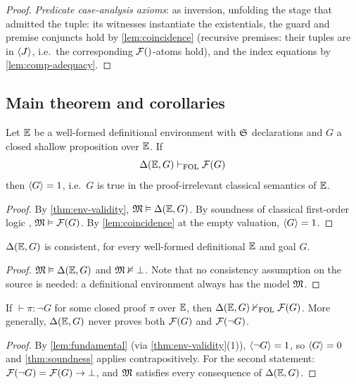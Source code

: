 \begin{proof}
\emph{Predicate case-analysis axioms}: as inversion, unfolding the stage
that admitted the tuple: its witnesses instantiate the existentials, the
guard and premise conjuncts hold by \cref{lem:coincidence} (recursive
premises: their tuples are in $\langle J \rangle$, i.e.\ the corresponding
$\mathcal{F}()$-atoms hold), and the index equations by
\cref{lem:comp-adequacy}.
\end{proof}

\subsection{Main theorem and corollaries}

\begin{theorem}[Soundness]
\label{thm:soundness}
Let $\mathbb{E}$ be a well-formed definitional environment with $\mathfrak{S}$
declarations and $G$ a closed shallow proposition over $\mathbb{E}$.  If
\[
  \Delta(\mathbb{E},G) \vdash_{\mathrm{FOL}} \mathcal{F}(G)
\]
then $\langle G \rangle = 1$, i.e.\ $G$ is true in the proof-irrelevant classical
semantics of $\mathbb{E}$.
\end{theorem}

\begin{proof}
By \cref{thm:env-validity}, $\mathfrak{M} \vDash \Delta(\mathbb{E},G)$.  By soundness of
classical first-order logic \cite{Shoenfield1967}, $\mathfrak{M} \vDash \mathcal{F}(G)$.
By \cref{lem:coincidence} at the empty valuation, $\langle G \rangle = 1$.
\end{proof}

\begin{corollary}[Consistency]
\label{cor:consistency}
$\Delta(\mathbb{E},G)$ is consistent, for every well-formed definitional $\mathbb{E}$ and
goal $G$.
\end{corollary}

\begin{proof}
$\mathfrak{M} \vDash \Delta(\mathbb{E},G)$ and $\mathfrak{M} \nvDash \bot$.  Note that no consistency
assumption on the source is needed: a definitional environment always
has the model $\mathfrak{M}$.
\end{proof}

\begin{corollary}
\label{cor:no-refutable}
If $\vdash \pi : \neg G$ for some closed proof $\pi$ over $\mathbb{E}$, then
$\Delta(\mathbb{E},G) \nvdash_{\mathrm{FOL}} \mathcal{F}(G)$.  More generally, $\Delta(\mathbb{E},G)$ never
proves both $\mathcal{F}(G)$ and $\mathcal{F}(\neg G)$.
\end{corollary}

\begin{proof}
By \cref{lem:fundamental} (via \cref{thm:env-validity}(1)),
$\langle \neg G \rangle = 1$, so $\langle G \rangle = 0$ and \cref{thm:soundness} applies
contrapositively.  For the second statement: $\mathcal{F}(\neg G) = \mathcal{F}(G) \to
\bot$, and $\mathfrak{M}$ satisfies every consequence of $\Delta(\mathbb{E},G)$.
\end{proof}

